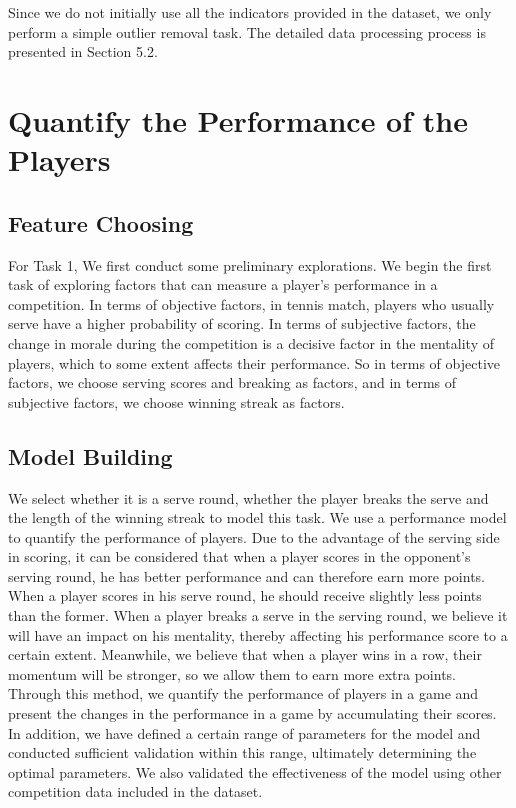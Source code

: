 \documentclass{mcmthesis}
\begin{document}
Since we do not initially use all the indicators provided in the dataset, we only perform a simple outlier removal task. The detailed data processing process is presented in Section 5.2.




\section{Quantify the Performance of the Players}
\subsection{Feature Choosing}
For Task 1, We first conduct some preliminary explorations.
We begin the first task of exploring factors that can measure a player's performance in a competition. In terms of objective factors, in tennis match, players who usually serve have a higher probability of scoring. In terms of subjective factors, the change in morale during the competition is a decisive factor in the mentality of players, which to some extent affects their performance. So in terms of objective factors, we choose serving scores and breaking as factors, and in terms of subjective factors, we choose winning streak as factors.
\subsection{Model Building}
We select whether it is a serve round, whether the player breaks the serve and the length of the winning streak to model this task. We use a performance model to quantify the performance of players. Due to the advantage of the serving side in scoring, it can be considered that when a player scores in the opponent's serving round, he has better performance and can therefore earn more points. When a player scores in his serve round, he should receive slightly less points than the former. When a player breaks a serve in the serving round, we believe it will have an impact on his mentality, thereby affecting his performance score to a certain extent. Meanwhile, we believe that when a player wins in a row, their momentum will be stronger, so we allow them to earn more extra points. Through this method, we quantify the performance of players in a game and present the changes in the performance in a game by accumulating their scores. In addition, we have defined a certain range of parameters for the model and conducted sufficient validation within this range, ultimately determining the optimal parameters. We also validated the effectiveness of the model using other competition data included in the dataset. 
\end{document}
